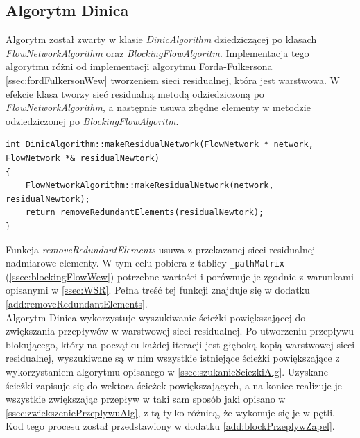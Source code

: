 \subsection{Algorytm Dinica}\label{ssec:dinicAlgWew}
Algorytm został zwarty w klasie \emph{DinicAlgorithm} dziedziczącej po klasach \emph{FlowNetworkAlgorithm} oraz \emph{BlockingFlowAlgoritm}. Implementacja tego algorytmu różni od implementacji algorytmu Forda-Fulkersona \ref{ssec:fordFulkersonWew} tworzeniem sieci residualnej, która jest warstwowa. W efekcie klasa tworzy sieć residualną metodą odziedziczoną po \emph{FlowNetworkAlgorithm}, a następnie usuwa zbędne elementy w metodzie odziedziczonej po \emph{BlockingFlowAlgoritm}.
\begin{verbatim}
int DinicAlgorithm::makeResidualNetwork(FlowNetwork * network, FlowNetwork *& residualNewtork)
{
	FlowNetworkAlgorithm::makeResidualNetwork(network, residualNewtork);
	return removeRedundantElements(residualNewtork);
}
\end{verbatim}
Funkcja \emph{removeRedundantElements} usuwa z przekazanej sieci residualnej nadmiarowe elementy. W tym celu pobiera z tablicy \lstinline{_pathMatrix} (\ref{ssec:blockingFlowWew}) potrzebne wartości i porównuje je zgodnie z  warunkami opisanymi w \ref{ssec:WSR}. Pełna treść tej funkcji znajduje się w dodatku \ref{add:removeRedundantElements}.\\\indent
Algorytm Dinica wykorzystuje wyszukiwanie ścieżki powiększającej do zwiększania przepływów w warstwowej sieci residualnej. Po utworzeniu przepływu blokującego, który na początku każdej iteracji jest głęboką kopią warstwowej sieci residualnej, wyszukiwane są w nim wszystkie istniejące ścieżki powiększające z wykorzystaniem algorytmu opisanego w \ref{ssec:szukanieSciezkiAlg}. Uzyskane ścieżki zapisuje się do wektora ścieżek powiększających, a na koniec realizuje je wszystkie zwiększając przepływ w taki sam sposób jaki opisano w \ref{ssec:zwiekszeniePrzeplywuAlg}, z tą tylko różnicą, że wykonuje się je w pętli. Kod tego procesu został przedstawiony w dodatku \ref{add:blockPrzeplywZapel}.
